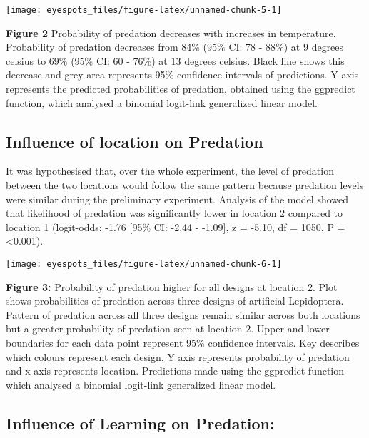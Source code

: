 \documentclass[
]{article}
\begin{document}
\begin{center}\texttt{[image: eyespots\_files/figure-latex/unnamed-chunk-5-1]} \end{center}

\textbf{Figure 2} Probability of predation decreases with increases in
temperature. Probability of predation decreases from 84\% (95\% CI: 78 -
88\%) at 9 degrees celsius to 69\% (95\% CI: 60 - 76\%) at 13 degrees
celsius. Black line shows this decrease and grey area represents 95\%
confidence intervals of predictions. Y axis represents the predicted
probabilities of predation, obtained using the ggpredict function, which
analysed a binomial logit-link generalized linear model.

\hypertarget{influence-of-location-on-predation}{%
\subsection{Influence of location on
Predation}\label{influence-of-location-on-predation}}

It was hypothesised that, over the whole experiment, the level of
predation between the two locations would follow the same pattern
because predation levels were similar during the preliminary experiment.
Analysis of the model showed that likelihood of predation was
significantly lower in location 2 compared to location 1 (logit-odds:
-1.76 {[}95\% CI: -2.44 - -1.09{]}, z = -5.10, df = 1050, P =
\textless0.001).

\begin{center}\texttt{[image: eyespots\_files/figure-latex/unnamed-chunk-6-1]} \end{center}

\textbf{Figure 3:} Probability of predation higher for all designs at
location 2. Plot shows probabilities of predation across three designs
of artificial Lepidoptera. Pattern of predation across all three designs
remain similar across both locations but a greater probability of
predation seen at location 2. Upper and lower boundaries for each data
point represent 95\% confidence intervals. Key describes which colours
represent each design. Y axis represents probability of predation and x
axis represents location. Predictions made using the ggpredict function
which analysed a binomial logit-link generalized linear model.

\hypertarget{influence-of-learning-on-predation}{%
\subsection{Influence of Learning on
Predation:}\label{influence-of-learning-on-predation}}
\end{document}
